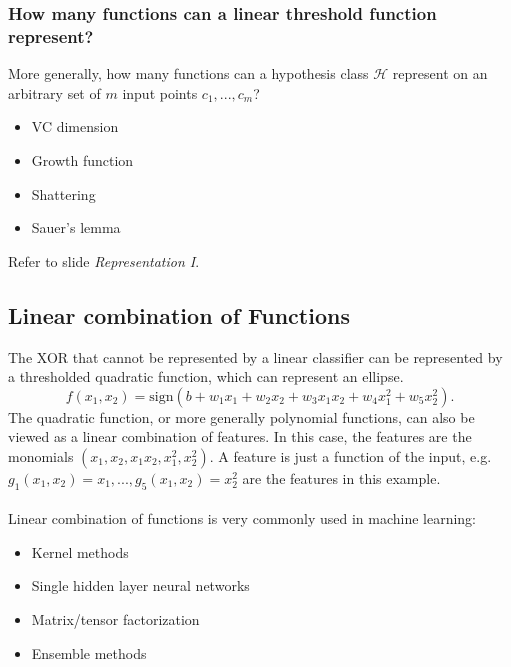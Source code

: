 \documentclass{article}
\begin{document}
   \subsubsection{How many functions can a linear threshold function represent?}
   More generally, how many functions can a hypothesis class $\mathcal{H}$ represent on an arbitrary set of $m$ input points $c_1,...,c_m$?
   \begin{itemize}
   \item VC dimension
   \item Growth function
   \item Shattering
   \item Sauer's lemma
   \end{itemize}
   Refer to slide \textit{Representation I}.
   
   \subsection{Linear combination of Functions}
   The XOR that cannot be represented by a linear classifier can be represented by a thresholded quadratic function, which can represent an ellipse.
   \begin{equation}
   f(x_1, x_2) = \text{sign}(b+w_1x_1+w_2x_2+w_3x_1x_2+w_4x_1^2+w_5x_2^2).
   \end{equation}
   The quadratic function, or more generally polynomial functions, can also be viewed as a linear combination of features. In this case, the features are the monomials $(x_1, x_2, x_1x_2, x_1^2, x_2^2)$. A feature is just a function of the input, e.g. $g_1(x_1, x_2) = x_1,...,g_5(x_1,x_2)=x_2^2$ are the features in this example. 
   \\\\
   Linear combination of functions is very commonly used in machine learning:
   \begin{itemize}
   \item Kernel methods
   \item Single hidden layer neural networks
   \item Matrix/tensor factorization
   \item Ensemble methods
   \end{itemize}
   
\end{document}
